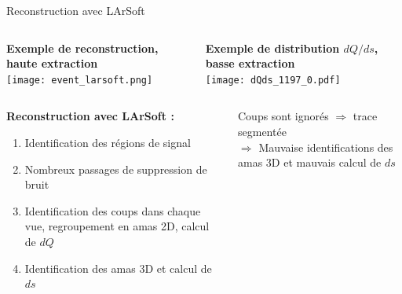     \begin{frame}{Reconstruction avec LArSoft}
        \begin{scriptsize}
            \begin{columns}
                \begin{column}{0.65\textwidth}
                    \centering \textbf{Exemple de reconstruction, haute extraction}\\
                    \centering \texttt{[image: event\_larsoft.png]}
                \end{column}
                \begin{column}{0.35\textwidth}
                    \centering \textbf{Exemple de distribution $dQ/ds$, basse extraction}\\
                    \centering \texttt{[image: dQds\_1197\_0.pdf]}
                \end{column}
            \end{columns}\vfill
            \begin{columns}
                \begin{column}{0.5\textwidth}
                    \textbf{Reconstruction avec LArSoft :}
                    \begin{enumerate}
                        \item Identification des régions de signal
                        \item Nombreux passages de suppression de bruit
                        \item Identification des coups dans chaque vue, regroupement en amas 2D, calcul de $dQ$
                        \item Identification des amas 3D et calcul de $ds$
                    \end{enumerate}
                \end{column}
                \begin{column}{0.5\textwidth}
                    Coups sont ignorés $\Rightarrow$ trace segmentée\\
                    $\Rightarrow$ Mauvaise identifications des amas 3D et mauvais calcul de $ds$
                \end{column}
            \end{columns}
        \end{scriptsize}
    \end{frame}
    
